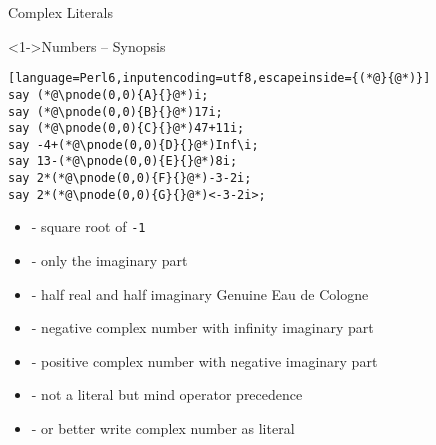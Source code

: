 \begin{frame}[fragile]{Complex Literals}
\begin{block}<1->{Numbers -- Synopsis}
\small
\begin{lstlisting}[language=Perl6,inputencoding=utf8,escapeinside={(*@}{@*)}]
say (*@\pnode(0,0){A}{}@*)i;
say (*@\pnode(0,0){B}{}@*)17i;
say (*@\pnode(0,0){C}{}@*)47+11i;
say -4+(*@\pnode(0,0){D}{}@*)Inf\i;
say 13-(*@\pnode(0,0){E}{}@*)8i;
say 2*(*@\pnode(0,0){F}{}@*)-3-2i;
say 2*(*@\pnode(0,0){G}{}@*)<-3-2i>;
\end{lstlisting}
\end{block}

\begin{itemize}
\item<2->  - square root of \texttt{-1}
\item<3->  - only the imaginary part
\item<4->  - half real and half imaginary Genuine Eau de Cologne
\item<5->  - negative complex number with infinity imaginary part
\item<6->  - positive complex number with negative imaginary part
\item<7->  - not a literal but mind operator precedence
\item<8->  - or better write complex number as literal
\end{itemize}
\end{frame}

